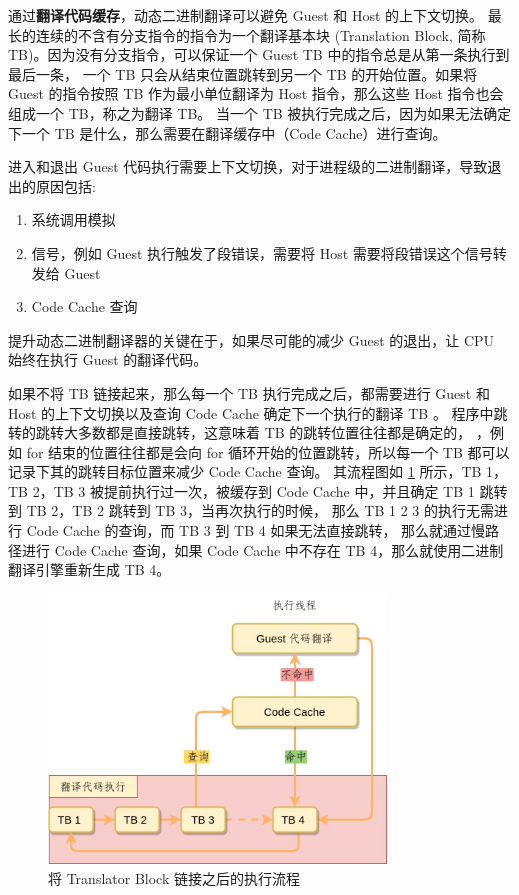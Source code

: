 通过\textbf{翻译代码缓存}，动态二进制翻译可以避免 Guest 和 Host 的上下文切换。
最长的连续的不含有分支指令的指令为一个翻译基本块 (Translation Block, 简称 TB)。因为没有分支指令，可以保证一个 Guest TB 中的指令总是从第一条执行到最后一条，
一个 TB 只会从结束位置跳转到另一个 TB 的开始位置。如果将 Guest 的指令按照 TB 作为最小单位翻译为 Host 指令，那么这些 Host 指令也会组成一个 TB，称之为翻译 TB。
当一个 TB 被执行完成之后，因为如果无法确定下一个 TB 是什么，那么需要在翻译缓存中（Code Cache）进行查询。

进入和退出 Guest 代码执行需要上下文切换，对于进程级的二进制翻译，导致退出的原因包括:
\begin{enumerate}
	\item 系统调用模拟
	\item 信号，例如 Guest 执行触发了段错误，需要将 Host 需要将段错误这个信号转发给 Guest
	\item Code Cache 查询
\end{enumerate}
提升动态二进制翻译器的关键在于，如果尽可能的减少 Guest 的退出，让 CPU 始终在执行 Guest 的翻译代码。

如果不将 TB 链接起来，那么每一个 TB 执行完成之后，都需要进行 Guest 和 Host 的上下文切换以及查询 Code Cache 确定下一个执行的翻译 TB 。
程序中跳转的跳转大多数都是直接跳转，这意味着 TB 的跳转位置往往都是确定的，
，例如 for 结束的位置往往都是会向 for 循环开始的位置跳转，所以每一个 TB 都可以记录下其的跳转目标位置来减少 Code Cache 查询。
其流程图如 \ref{fig:basic_flow4} 所示，TB 1，TB 2，TB 3 被提前执行过一次，被缓存到 Code Cache 中，并且确定 TB 1 跳转到 TB 2，TB 2 跳转到 TB 3，当再次执行的时候，
那么 TB 1 2 3 的执行无需进行 Code Cache 的查询，而 TB 3 到 TB 4 如果无法直接跳转，
那么就通过慢路径进行 Code Cache 查询，如果 Code Cache 中不存在 TB 4，那么就使用二进制翻译引擎重新生成 TB 4。

\begin{figure}[!htbp]
	\centering
	\includegraphics[width=0.8\textwidth]{./images/basic-flow4.jpg}
	\caption{将 Translator Block 链接之后的执行流程}
	\label{fig:basic_flow4}
\end{figure}

